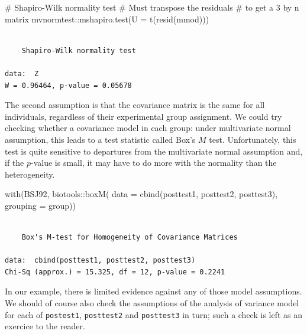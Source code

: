 \documentclass[
  11pt,
  letterpaper,
]{scrbook}
\newenvironment{Shaded}{\begin{snugshade}}{\end{snugshade}}
\newcommand{\AttributeTok}[1]{\textcolor[rgb]{0.40,0.45,0.13}{#1}}
\newcommand{\CommentTok}[1]{\textcolor[rgb]{0.37,0.37,0.37}{#1}}
\newcommand{\FunctionTok}[1]{\textcolor[rgb]{0.28,0.35,0.67}{#1}}
\newcommand{\NormalTok}[1]{\textcolor[rgb]{0.00,0.23,0.31}{#1}}
\newcommand{\SpecialCharTok}[1]{\textcolor[rgb]{0.37,0.37,0.37}{#1}}
\theoremstyle{definition}
\theoremstyle{remark}
\begin{document}
\begin{Shaded}
\begin{Highlighting}[]
\CommentTok{\# Shapiro{-}Wilk normality test}
\CommentTok{\# Must transpose the residuals }
\CommentTok{\# to get a 3 by n matrix}
\NormalTok{mvnormtest}\SpecialCharTok{::}\FunctionTok{mshapiro.test}\NormalTok{(}\AttributeTok{U =} \FunctionTok{t}\NormalTok{(}\FunctionTok{resid}\NormalTok{(mmod)))}
\end{Highlighting}
\end{Shaded}

\begin{verbatim}

    Shapiro-Wilk normality test

data:  Z
W = 0.96464, p-value = 0.05678
\end{verbatim}

The second assumption is that the covariance matrix is the same for all
individuals, regardless of their experimental group assignment. We could
try checking whether a covariance model in each group: under
multivariate normal assumption, this leads to a test statistic called
Box's \(M\) test. Unfortunately, this test is quite sensitive to
departures from the multivariate normal assumption and, if the
\(p\)-value is small, it may have to do more with the normality than the
heterogeneity.

\begin{Shaded}
\begin{Highlighting}[]
\FunctionTok{with}\NormalTok{(BSJ92, }
\NormalTok{     biotools}\SpecialCharTok{::}\FunctionTok{boxM}\NormalTok{(}
       \AttributeTok{data =} \FunctionTok{cbind}\NormalTok{(posttest1, posttest2, posttest3),}
       \AttributeTok{grouping =}\NormalTok{ group))}
\end{Highlighting}
\end{Shaded}

\begin{verbatim}

    Box's M-test for Homogeneity of Covariance Matrices

data:  cbind(posttest1, posttest2, posttest3)
Chi-Sq (approx.) = 15.325, df = 12, p-value = 0.2241
\end{verbatim}

In our example, there is limited evidence against any of those model
assumptions. We should of course also check the assumptions of the
analysis of variance model for each of \texttt{postest1},
\texttt{posttest2} and \texttt{posttest3} in turn; such a check is left
as an exercice to the reader.
\end{document}
